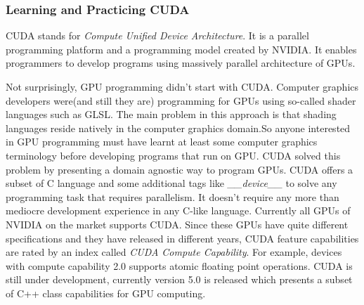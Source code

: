 \documentclass[12pt]{report}
\begin{document}
 \subsubsection{Learning and Practicing CUDA}
 
 CUDA stands for \emph{Compute Unified Device Architecture}. It is a parallel programming platform and a programming model created by NVIDIA. It enables programmers to develop programs using massively parallel architecture of GPUs.
 
 Not surprisingly, GPU programming didn't start with CUDA. Computer graphics developers were(and still they are) programming for GPUs using so-called shader languages such as GLSL. The main problem in this approach is that shading languages reside natively in the computer graphics domain.So anyone interested in GPU programming must have learnt at least some computer graphics terminology before developing programs that run on GPU. CUDA solved this problem by presenting a domain agnostic way to program GPUs. CUDA offers a subset of C language and some additional tags like \emph{\_\_device\_\_} to solve any programming task that requires parallelism. It doesn't require any more than mediocre development experience in any C-like language. Currently all GPUs of NVIDIA on the market supports CUDA. Since these GPUs have quite different specifications and they have released in different years, CUDA feature capabilities are rated by an index called \emph{CUDA Compute Capability}. For example, devices with compute capability 2.0 supports atomic floating point operations. CUDA is still under development, currently version 5.0 is released which presents a subset of C++ class capabilities for GPU computing. 
 
\end{document}

